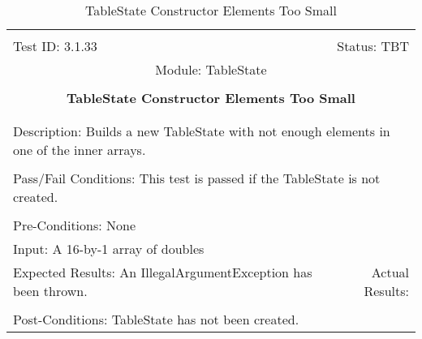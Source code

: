 \documentclass[titlepage]{article}
\begin{document}
\begin{center}%
\begin{table}[h!]
\begin{tabular}{|l r|}\hline&\\[-2mm]
	Test ID: 3.1.33	&Status: TBT\\[-3mm]
	\multicolumn{2}{|c|}{Module: TableState}\\&\\
	\multicolumn{2}{|c|}{\textbf{\large{TableState Constructor Elements Too Small}}}\\&\\\hline&\\[-3mm]
	\multicolumn{2}{|p{\textwidth}|}{Description: Builds a new TableState with not enough elements in one of the inner arrays.}\\[1mm]\hline&\\[-3mm]
	\multicolumn{2}{|p{\textwidth}|}{Pass/Fail Conditions: This test is passed if the TableState is not created.}\\[1mm]\hline&\\[-3mm]
	\multicolumn{2}{|p{\textwidth}|}{Pre-Conditions: None}\\[4mm]
	\multicolumn{2}{|p{\textwidth}|}{Input: A 16-by-1 array of doubles}\\[2mm]\hline
	\multicolumn{1}{|p{0.49\textwidth}}{Expected Results: An IllegalArgumentException has been thrown.}	&\multicolumn{1}{|p{0.45\textwidth}|}{Actual Results: }\\\hline&\\[-3mm]
	\multicolumn{2}{|p{\textwidth}|}{Post-Conditions: TableState has not been created.}\\\hline
\end{tabular}
\caption{TableState Constructor Elements Too Small}
\end{table}
\end{center}
\newpage
\end{document}

